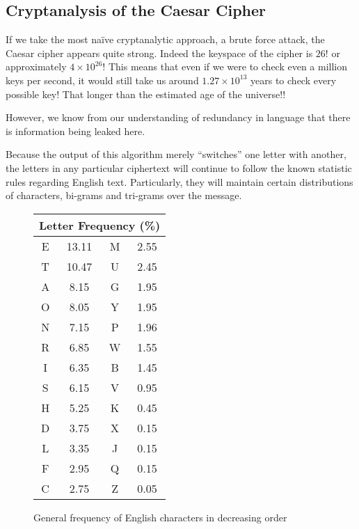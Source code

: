 \documentclass[12pt, a4paper, draft]{report}
\begin{document}

\subsection{Cryptanalysis of the Caesar Cipher}

If we take the most naïve cryptanalytic approach, a brute force attack,
the Caesar cipher appears quite strong. Indeed the keyspace of the cipher
is $26!$ or approximately $4 \times 10^{26}$! This means that even if we
were to check even a million keys per second, it would still take us around
$1.27 \times 10^{13}$ years to check every possible key! That longer than
the estimated age of the universe!!

However, we know from our understanding of redundancy in language that there
is information being leaked here.

Because the output of this algorithm merely ``switches'' one letter with another,
the letters in any particular ciphertext will continue to follow the known
statistic rules regarding English text. Particularly, they will maintain certain
distributions of characters, bi-grams and tri-grams over the message.

\begin{figure}[h]
\begin{center}
\begin{tabular}{cccc}
\toprule
\multicolumn{4}{c}{Letter Frequency (\%)}\\
\midrule
E & 13.11 & M & 2.55\\
T & 10.47 & U & 2.45\\
A & 8.15  & G & 1.95\\
O & 8.05  & Y & 1.95\\
N & 7.15  & P & 1.96\\
R & 6.85  & W & 1.55\\
I & 6.35  & B & 1.45\\
S & 6.15  & V & 0.95\\
H & 5.25  & K & 0.45\\
D & 3.75  & X & 0.15\\
L & 3.35  & J & 0.15\\
F & 2.95  & Q & 0.15\\
C & 2.75  & Z & 0.05\\
\bottomrule
\end{tabular}
\end{center}
\caption{General frequency of English characters in decreasing order}
\end{figure}
\end{document}
